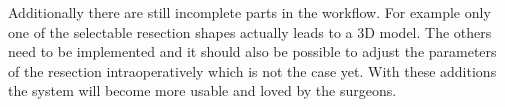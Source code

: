 Additionally there are still incomplete
parts in the workflow. For example only one of the selectable resection shapes
actually leads to a 3D model. The others need to be implemented and it should
also be possible to adjust the parameters of the resection intraoperatively
which is not the case yet. With these additions the system will become more
usable and loved by the surgeons.





